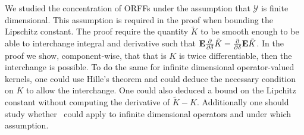 \begin{remark}\label{remark:infinite_dimension}
We studied the concentration of ORFFs under the assumption that $\mathcal{Y}$ is finite dimensional. This assumption is required in the proof when bounding the Lipschitz constant. The proof require the quantity $\tilde{K}$ to be smooth enough to be able to interchange integral and derivative such that ${\mathbf{{E}}}\frac{\partial}{\partial \delta}\tilde{K}=\frac{\partial}{\partial \delta}{\mathbf{{E}}}\tilde{K}$. In the proof we show, component-wise, that that is $K$ is twice differentiable, then the interchange is possible. To do the same for infinite dimensional operator-valued kernels, one could use Hille's theorem and could deduce the necessary condition on $K$ to allow the interchange. One could also deduced a bound on the Lipchitz constant without computing the derivative of $\tilde{K}-K$. Additionally one should study whether~\citet[theorem 4]{koltchinskii2013remark} could apply to infinite dimensional operators and under which assumption.
\end{remark}
